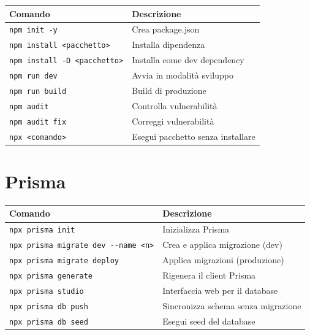 \begin{center}
\begin{tabularx}{\textwidth}{l X}
\toprule
\textbf{Comando} & \textbf{Descrizione} \\
\midrule
\texttt{npm init -y} & Crea package.json \\
\texttt{npm install <pacchetto>} & Installa dipendenza \\
\texttt{npm install -D <pacchetto>} & Installa come dev dependency \\
\texttt{npm run dev} & Avvia in modalità sviluppo \\
\texttt{npm run build} & Build di produzione \\
\texttt{npm audit} & Controlla vulnerabilità \\
\texttt{npm audit fix} & Correggi vulnerabilità \\
\texttt{npx <comando>} & Esegui pacchetto senza installare \\
\bottomrule
\end{tabularx}
\end{center}

\section{Prisma}

\begin{center}
\begin{tabularx}{\textwidth}{l X}
\toprule
\textbf{Comando} & \textbf{Descrizione} \\
\midrule
\texttt{npx prisma init} & Inizializza Prisma \\
\texttt{npx prisma migrate dev -{}-name <n>} & Crea e applica migrazione (dev) \\
\texttt{npx prisma migrate deploy} & Applica migrazioni (produzione) \\
\texttt{npx prisma generate} & Rigenera il client Prisma \\
\texttt{npx prisma studio} & Interfaccia web per il database \\
\texttt{npx prisma db push} & Sincronizza schema senza migrazione \\
\texttt{npx prisma db seed} & Esegui seed del database \\
\bottomrule
\end{tabularx}
\end{center}


